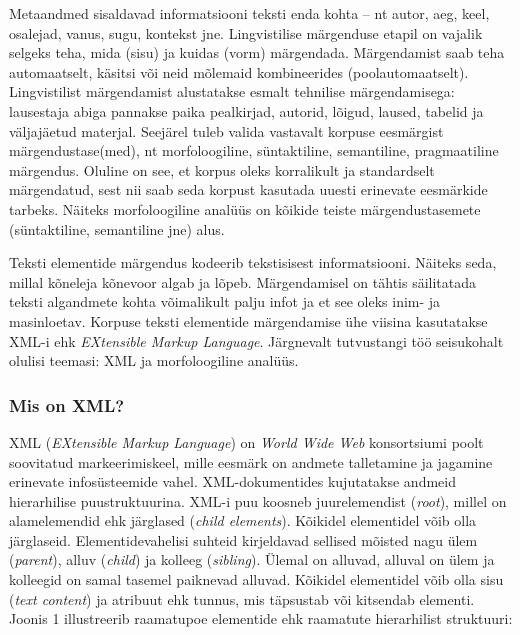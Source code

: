 \documentclass[12pt]{article}
\begin{document}
Metaandmed sisaldavad informatsiooni teksti enda kohta -- nt autor, aeg, keel, osalejad, vanus, sugu, kontekst jne. Lingvistilise märgenduse etapil on vajalik selgeks teha, mida (sisu) ja kuidas (vorm) märgendada. Märgendamist saab teha automaatselt, käsitsi või neid mõlemaid kombineerides (poolautomaatselt). Lingvistilist märgendamist alustatakse esmalt tehnilise märgendamisega: lausestaja abiga pannakse paika pealkirjad, autorid, lõigud, laused, tabelid ja väljajäetud materjal. Seejärel tuleb valida vastavalt korpuse eesmärgist märgendustase(med), nt morfoloogiline, süntaktiline, semantiline, pragmaatiline märgendus. Oluline on see, et korpus oleks korralikult ja standardselt märgendatud, sest nii saab seda korpust kasutada uuesti erinevate eesmärkide tarbeks. Näiteks morfoloogiline analüüs on kõikide teiste märgendustasemete (süntaktiline, semantiline jne) alus. \citep[12--14]{KR}

Teksti elementide märgendus kodeerib tekstisisest informatsiooni. Näiteks seda, millal kõneleja kõnevoor algab ja lõpeb. Märgendamisel on tähtis säilitatada teksti algandmete kohta võimalikult palju infot ja et see oleks inim- ja masinloetav. Korpuse teksti elementide märgendamise ühe viisina kasutatakse XML-i ehk \emph{EXtensible Markup Language}. \citep[29--30]{KORPUS} Järgnevalt tutvustangi töö seisukohalt olulisi teemasi: XML ja morfoloogiline analüüs.


\subsubsection{Mis on XML?}

XML (\emph{EXtensible Markup Language}) on \emph{World Wide Web} konsortsiumi poolt soovitatud markeerimiskeel, mille eesmärk on andmete talletamine ja jagamine erinevate infosüsteemide vahel. XML-dokumentides kujutatakse andmeid hierarhilise puustruktuurina. XML-i puu koosneb juurelemendist (\emph{root}), millel on alamelemendid ehk järglased (\emph{child elements}). Kõikidel elementidel võib olla järglaseid. Elementidevahelisi suhteid kirjeldavad sellised mõisted nagu ülem (\emph{parent}), alluv (\emph{child}) ja kolleeg (\emph{sibling}). Ülemal on alluvad, alluval on ülem ja kolleegid on samal tasemel paiknevad alluvad. Kõikidel elementidel võib olla sisu (\emph{text content}) ja atribuut ehk tunnus, mis täpsustab või kitsendab elementi. \citep{XML} Joonis 1 illustreerib raamatupoe elementide ehk raamatute hierarhilist struktuuri:
\end{document}
